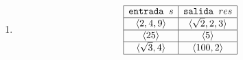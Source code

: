 \documentclass[12pt,a4paper,spanish]{article}
\begin{document}
\begin{enumerate}[label=\alph*)]
	\item

	      \def\salidaLarga{
		      \begin{array}{c}
			      \secuencia{\sqrt{2}, 2, 3} \\
		      \end{array}
	      }
	      \[
		      \begin{array}{|c|c|}
			      \hline
			      \texttt{entrada } s    & \texttt{salida } res \\  \hline
			      \secuencia{2, 4, 9}    & \salidaLarga         \\ \hline
			      \secuencia{25}         & \secuencia{5}        \\ \hline
			      \secuencia{\sqrt{3},4} & \secuencia{100, 2}   \\ \hline
		      \end{array}
	      \]
\end{enumerate}

\ejercicio
\end{document}
